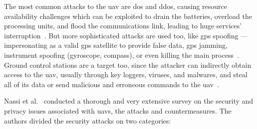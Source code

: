 The most common attacks to the  \gls{uav} are \gls{dos} and \gls{ddos}, causing
resource availability challenges which can be exploited to drain the batteries,
overload the processing units, and flood the communications link, leading to
huge services' interruption~\cite{mohsan2022towards}. But more sophisticated attacks are used too, like
\gls{gps} spoofing --- impersonating as a valid \gls{gps} satellite to provide
false data, \gls{gps} jamming, instrument spoofing (gyroscope, compass), or even
killing the main process~\cite{nassi2021sok}. Ground control stations are a target too, since the
attacker can indirectly obtain access to the \gls{uav}, usually through key
loggers, viruses, and malwares,  and steal all of its data or send malicious
and erroneous commands to the \gls{uav}~\cite{mohsan2022towards}.

Nassi et al.~\cite{nassi2021sok} conducted a thorough and very extensive survey
on the security and privacy issues associated with \glspl{uav}, the attacks and countermeasures. The authors
divided the security attacks on two categories:
